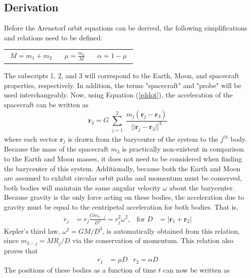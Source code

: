 \documentclass[conf]{new-aiaa}
\begin{document}
    \subsection{Derivation}
    Before the Arenstorf orbit equations can be derived, the following simplifications and relations need to be defined:
    \begin{tabularx}{\linewidth}{>{\leqnomode}XXX}
        \begin{equation}
        \begin{aligned}
            M = m_1 + m_2
            \label{Mass}
        \end{aligned}
        \end{equation}
        &        
        \begin{equation}
        \begin{aligned}
            \mu = \frac{m_2}{M}
            \label{mu}
        \end{aligned}
        \end{equation}
        &
        \begin{equation}
        \begin{aligned}
            \alpha = 1- \mu
            \label{alpha}
        \end{aligned}
        \end{equation}
    \end{tabularx}
    
    The subscripts 1, 2, and 3 will correspond to the Earth, Moon, and spacecraft properties, respectively. In addition, the terms "spacecraft" and "probe" will be used interchangeably. Now, using Equation (\ref{rddot}), the acceleration of the spacecraft can be written as
    \begin{equation}
	    \bm{\ddot{r}}_3 =  G \sum_{\substack{j=1}} ^{2} \frac{m_j (\bm{r}_j-\bm{r}_3)}{||\bm{r}_j-\bm{r}_3||^3}	
	    \label{gravity}
    \end{equation}
    where each vector $\bm{r}_j$ is drawn from the barycenter of the system to the $j^{th}$ body. Because the mass of the spacecraft $m_3$ is practically non-existent in comparison to the Earth and Moon masses, it does not need to be considered when finding the barycenter of this system. Additionally, because both the Earth and Moon are assumed to exhibit circular orbit paths and momentum must be conserved, both bodies will maintain the same angular velocity $\omega$ about the barycenter. Because gravity is the only force acting on these bodies, the acceleration due to gravity must be equal to the centripetal acceleration for both bodies. That is,
    \begin{align}
        \dot{r}_j &= r_j\frac{G m_{3-j}}{D^2} = r_j^2\omega^2,
        &
        \text{for } D &= |\bm{r}_1 + \bm{r}_2|
        \label{relation}
    \end{align}
    Kepler's third law, $\omega^2 = GM/D^3$,  is automatically obtained from this relation, since $m_{3-j} = MR_j/D$ via the conservation of momentum. This relation also proves that
    \begin{align}
        r_1 &= \mu D
        &
        r_2 = \alpha D
    \end{align}
    The positions of these bodies as a function of time $t$ can now be written as
\end{document}
